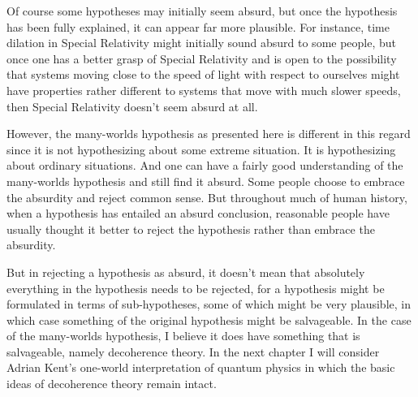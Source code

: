      Of course some hypotheses may initially seem absurd, but once the hypothesis has been fully explained, it can appear far more plausible. For instance, time dilation in Special Relativity might initially sound absurd to some people, but once one has a better grasp of Special Relativity and is open to the possibility that  systems moving close to the speed of light with respect to ourselves might have properties rather different to systems that move with much slower speeds, then Special Relativity doesn't seem absurd at all.  
     
     However, the many-worlds hypothesis as presented here is different in this regard since it is not hypothesizing about some extreme situation. It is hypothesizing about ordinary situations. And one can have a fairly good understanding of the many-worlds hypothesis and still find it absurd. Some people choose to embrace the absurdity and reject common sense. But throughout much of human history, when a hypothesis has entailed an absurd conclusion, reasonable people have usually thought it better to reject the hypothesis rather than embrace the absurdity. 
      
     But in rejecting a hypothesis as absurd, it doesn't mean that absolutely everything in the hypothesis needs to be rejected, for  a hypothesis might be formulated in terms of sub-hypotheses, some of which might be very plausible, in which case something of the original hypothesis might be salvageable. In the case of the many-worlds hypothesis, I believe it does have something that is salvageable, namely decoherence theory. In the next chapter I will consider Adrian Kent's one-world interpretation of quantum physics in which the basic ideas of decoherence theory remain intact.
    
    